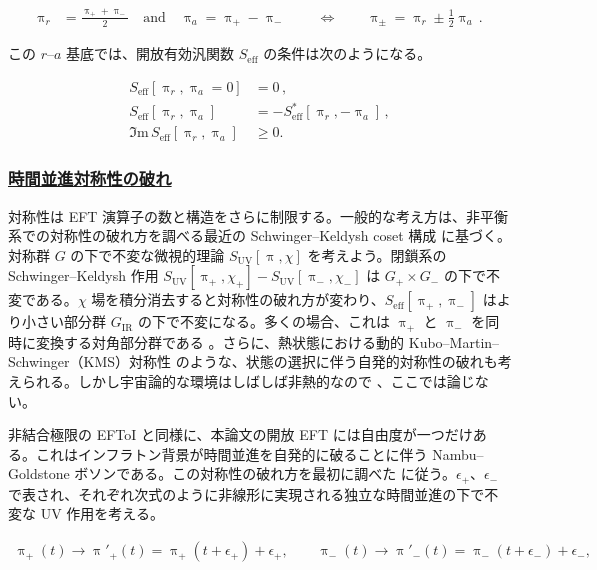 \documentclass[a4paper,11pt]{ltjsarticle}
\numberwithin{equation}{section}
\newcommand{\subsubsectionlink}[1]{\subsubsection[#1]{\hyperlink{toc}{#1}}}
\def\uppia{\uppi_{a}}
\def\uppir{\uppi_{r}}
\newcommand{\Ima}{\Im \mathrm{m}\,}
\begin{document}
\begin{align}\label{eq:basis}
 \uppi_r &= \frac{\uppi_+ + \uppi_-}{2} \quad \mathrm{and} \quad \uppi_a = \uppi_+ - \uppi_-\, \qquad \Leftrightarrow \qquad  \uppi_\pm =\uppir\pm \frac12 \uppia\,.
\end{align}

この $r$--$a$ 基底では、開放有効汎関数 $S_{\mathrm{eff}}$ の条件は次のようになる。

\begin{align}
S_{\mathrm{eff}} \left[\uppi_r,\uppi_a = 0\right] &= 0 \,,\label{eq:norm} \\
S_{\mathrm{eff}} \left[\uppi_r,\uppi_a\right] &= - 	S^*_{\mathrm{eff}} \left[\uppi_r,-\uppi_a\right] \,,\label{eq:herm} \\
\Ima S_{\mathrm{eff}} \left[\uppi_r,\uppi_a\right] &\geq 0. \label{eq:pos}
\end{align}

\subsubsectionlink{時間並進対称性の破れ}

対称性は EFT 演算子の数と構造をさらに制限する。一般的な考え方は、非平衡系での対称性の破れ方を調べる最近の Schwinger--Keldysh coset 構成 \cite{Akyuz:2023lsm} に基づく。対称群 $G$ の下で不変な微視的理論 $S_{\mathrm{UV}}[\uppi,\chi]$ を考えよう。閉鎖系の Schwinger--Keldysh 作用 $S_{\mathrm{UV}}[\uppi_+,\chi_+]-S_{\mathrm{UV}}[\uppi_-,\chi_-]$ は $G_+\times G_-$ の下で不変である。$\chi$ 場を積分消去すると対称性の破れ方が変わり、$S_{\mathrm{eff}}[\uppi_+,\uppi_-]$ はより小さい部分群 $G_{\mathrm{IR}}$ の下で不変になる。多くの場合、これは $\uppi_+$ と $\uppi_-$ を同時に変換する対角部分群である \cite{Akyuz:2023lsm}。さらに、熱状態における動的 Kubo--Martin--Schwinger（KMS）対称性 \cite{Liu:2018kfw} のような、状態の選択に伴う自発的対称性の破れも考えられる。しかし宇宙論的な環境はしばしば非熱的なので \cite{Colas:2022hlq,Hsiang:2021vgx}、ここでは論じない。

非結合極限の EFToI \cite{Creminelli:2006xe,Cheung:2007st,LopezNacir:2011kk} と同様に、本論文の開放 EFT には自由度が一つだけある。これはインフラトン背景が時間並進を自発的に破ることに伴う Nambu--Goldstone ボソンである。この対称性の破れ方を最初に調べた \cite{Hongo:2018ant} に従う。$\epsilon_+$、$\epsilon_-$ で表され、それぞれ次式のように非線形に実現される独立な時間並進の下で不変な UV 作用を考える。

\begin{align}
        \uppi_+(t) \rightarrow \uppi'_+(t) = \uppi_+(t+\epsilon_+)+\epsilon_+,\quad\quad\uppi_-(t) \rightarrow \uppi'_-(t) = \uppi_-(t+\epsilon_-)+\epsilon_-,  
    \end{align}
\end{document}
